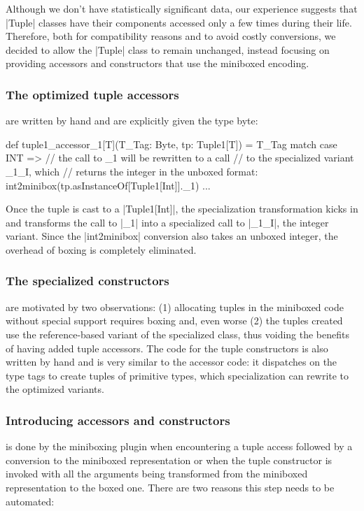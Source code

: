 Although we don't have statistically significant data, our experience suggests that |Tuple| classes have their components accessed only a few times during their life. Therefore, both for compatibility reasons and to avoid costly conversions, we decided to allow the |Tuple| class to remain unchanged, instead focusing on providing accessors and constructors that use the miniboxed encoding.

\subsubsection*{The optimized tuple accessors} are written by hand and are explicitly given the type byte:

\begin{lstlisting-nobreak}
 def tuple1_accessor_1[T](T_Tag: Byte, tp: Tuple1[T]) =
   T_Tag match {
     case INT =>
       // the call to _1 will be rewritten to a call
       // to the specialized variant _1_I, which
       // returns the integer in the unboxed format:
       int2minibox(tp.asInstanceOf[Tuple1[Int]]._1)
     ...
   }
\end{lstlisting-nobreak}

Once the tuple is cast to a |Tuple1[Int]|, the specialization transformation kicks in and transforms the call to |_1| into a specialized call to |_1_I|, the integer variant. Since the |int2minibox| conversion also takes an unboxed integer, the overhead of boxing is completely eliminated.


\subsubsection*{The specialized constructors} are motivated by two observations: (1) allocating tuples in the miniboxed code without special support requires boxing and, even worse (2) the tuples created use the reference-based variant of the specialized class, thus voiding the benefits of having added tuple accessors. The code for the tuple constructors is also written by hand and is very similar to the accessor code: it dispatches on the type tags to create tuples of primitive types, which specialization can rewrite to the optimized variants. 


\subsubsection*{Introducing accessors and constructors} is done by the miniboxing plugin when encountering a tuple access followed by a conversion to the miniboxed representation or when the tuple constructor is invoked with all the arguments being transformed from the miniboxed representation to the boxed one. There are two reasons this step needs to be automated:

